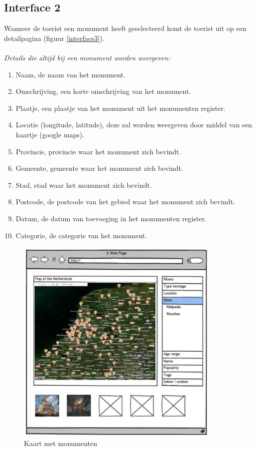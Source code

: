 \documentclass[a4paper,10pt]{article}
\begin{document}
			\subsection{Interface 2}
			Wanneer de toerist een monument heeft geselecteerd komt de toerist uit op een detailpagina (figuur \ref{interface3}).\\
			\\
			\textit{Details die altijd bij een monument worden weergeven:}
			\begin{enumerate}
				\item Naam, de naam van het monument.
				\item Omschrijving, een korte omschrijving van het monument.
				\item Plaatje, een plaatje van het monument uit het monumenten register.
				\item Locatie (longitude, latitude), deze zal worden weergeven door middel van een kaartje (google maps).
				\item Provincie, provincie waar het monument zich bevindt.
				\item Gemeente, gemeente waar het monument zich bevindt.
				\item Stad, stad waar het monument zich bevindt.
				\item Postcode, de postcode van het gebied waar het monument zich bevindt.
				\item Datum, de datum van toevoeging in het monumenten register.
				\item Categorie, de categorie van het monument.
			\end{enumerate}
			
			\begin{figure}[ht!]
				\centering
				\includegraphics[height=10cm]{interface1.png}
				\caption{Kaart met monumenten \label{interface1}}
			\end{figure}
			
\end{document}
